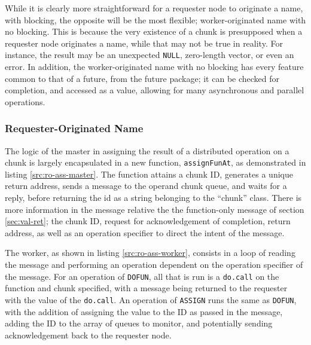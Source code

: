 \documentclass[a4paper,10pt]{article}
\begin{document}
While it is clearly more straightforward for a requester node to originate a
name, with blocking, the opposite will be the most flexible; worker-originated
name with no blocking.
This is because the very existence of a chunk is presupposed when a requester
node originates a name, while that may not be true in reality.
For instance, the result may be an unexpected \texttt{NULL}, zero-length
vector, or even an error.
In addition, the worker-originated name with no blocking has every feature
common to that of a future, from the future package; it can be checked for
completion, and accessed as a value, allowing for many asynchronous and
parallel operations.

\subsubsection{Requester-Originated Name}

The logic of the master in assigning the result of a distributed operation on a
chunk is largely encapsulated in a new function, \texttt{assignFunAt}, as
demonstrated in listing \ref{src:ro-ass-master}.
The function attains a chunk ID, generates a unique return address, sends a
message to the operand chunk queue, and waits for a reply, before returning the
id as a string belonging to the ``chunk'' class.
There is more information in the message relative the the function-only
message of section \ref{sec:val-ret}; the chunk ID, request for acknowledgement
of completion, return address, as well as an operation specifier to direct the
intent of the message.



The worker, as shown in listing \ref{src:ro-ass-worker}, consists in a loop of
reading the message and performing an operation dependent on the operation
specifier of the message.
For an operation of \texttt{DOFUN}, all that is run is a \texttt{do.call} on
the function and chunk specified, with a message being returned to the
requester with the value of the \texttt{do.call}.
An operation of \texttt{ASSIGN} runs the same as \texttt{DOFUN}, with the
addition of assigning the value to the ID as passed in the message, adding
the ID to the array of queues to monitor, and potentially sending
acknowledgement back to the requester node.
\newpage

\end{document}
